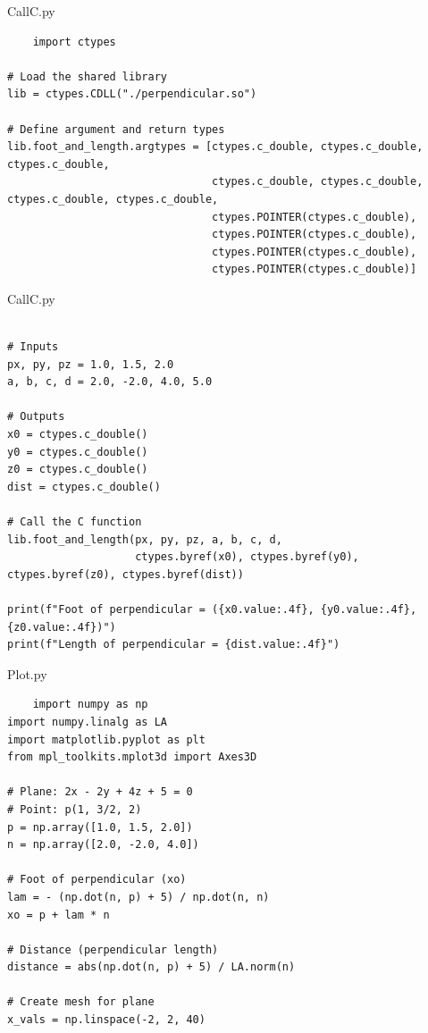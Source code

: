 \documentclass{beamer}
\begin{document}
\begin{frame}[fragile]{CallC.py}
\begin{lstlisting}
    import ctypes

# Load the shared library
lib = ctypes.CDLL("./perpendicular.so")

# Define argument and return types
lib.foot_and_length.argtypes = [ctypes.c_double, ctypes.c_double, ctypes.c_double,
                                ctypes.c_double, ctypes.c_double, ctypes.c_double, ctypes.c_double,
                                ctypes.POINTER(ctypes.c_double),
                                ctypes.POINTER(ctypes.c_double),
                                ctypes.POINTER(ctypes.c_double),
                                ctypes.POINTER(ctypes.c_double)]

\end{lstlisting}
\end{frame}

\begin{frame}[fragile]{CallC.py}
\begin{lstlisting}

# Inputs
px, py, pz = 1.0, 1.5, 2.0
a, b, c, d = 2.0, -2.0, 4.0, 5.0

# Outputs
x0 = ctypes.c_double()
y0 = ctypes.c_double()
z0 = ctypes.c_double()
dist = ctypes.c_double()

# Call the C function
lib.foot_and_length(px, py, pz, a, b, c, d,
                    ctypes.byref(x0), ctypes.byref(y0), ctypes.byref(z0), ctypes.byref(dist))

print(f"Foot of perpendicular = ({x0.value:.4f}, {y0.value:.4f}, {z0.value:.4f})")
print(f"Length of perpendicular = {dist.value:.4f}")
\end{lstlisting}
\end{frame}

\begin{frame}[fragile]{Plot.py}
\begin{lstlisting}
    import numpy as np
import numpy.linalg as LA
import matplotlib.pyplot as plt
from mpl_toolkits.mplot3d import Axes3D

# Plane: 2x - 2y + 4z + 5 = 0
# Point: p(1, 3/2, 2)
p = np.array([1.0, 1.5, 2.0])
n = np.array([2.0, -2.0, 4.0])

# Foot of perpendicular (xo)
lam = - (np.dot(n, p) + 5) / np.dot(n, n)
xo = p + lam * n

# Distance (perpendicular length)
distance = abs(np.dot(n, p) + 5) / LA.norm(n)

# Create mesh for plane
x_vals = np.linspace(-2, 2, 40)
\end{lstlisting}
\end{frame}
\end{document}
